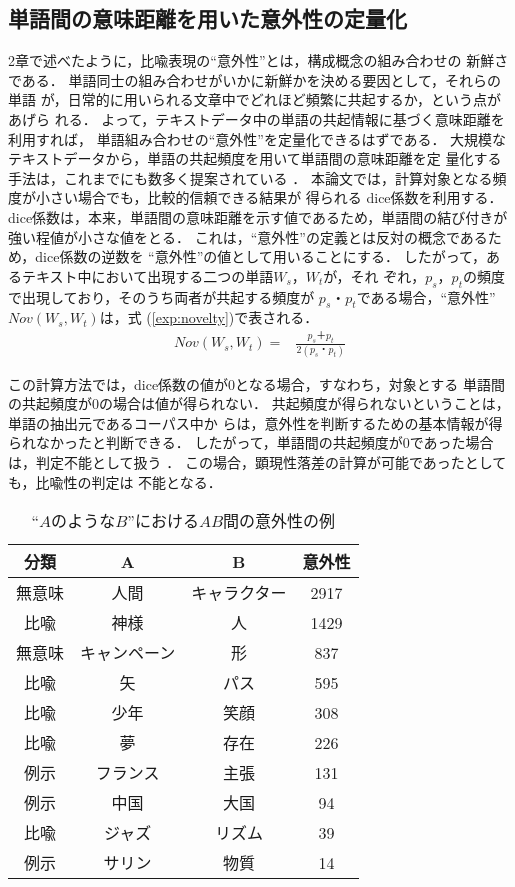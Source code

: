 \subsection{単語間の意味距離を用いた意外性の定量化}
2章で述べたように，比喩表現の``意外性''とは，構成概念の組み合わせの
新鮮さである．
単語同士の組み合わせがいかに新鮮かを決める要因として，それらの単語
が，日常的に用いられる文章中でどれほど頻繁に共起するか，という点があげら
れる．
よって，テキストデータ中の単語の共起情報に基づく意味距離を利用すれば，
単語組み合わせの``意外性''を定量化できるはずである．
大規模なテキストデータから，単語の共起頻度を用いて単語間の意味距離を定
量化する手法は，これまでにも数多く提案されている
\cite{Salton1989,Church1990,Smaja1993}．
本論文では，計算対象となる頻度が小さい場合でも，比較的信頼できる結果が
得られる dice係数を利用する．
 dice係数は，本来，単語間の意味距離を示す値であるため，単語間の結び付きが
強い程値が小さな値をとる．
これは，``意外性''の定義とは反対の概念であるため，dice係数の逆数を
``意外性''の値として用いることにする．
したがって，あるテキスト中において出現する二つの単語$W_s$，$W_t$が，それ
ぞれ，$p_s$，$p_t$の頻度で出現しており，そのうち両者が共起する頻度が
$p_s・p_t$である場合，``意外性''$Nov(W_s,W_t)$は，式
(\ref{exp:novelty})で表される．
\begin{eqnarray}
\label{exp:novelty}
Nov(W_s,W_t) = & \frac{p_s＋p_t}{2(p_s・p_t)}
\end{eqnarray}

この計算方法では，dice係数の値が0となる場合，すなわち，対象とする
単語間の共起頻度が0の場合は値が得られない．
共起頻度が得られないということは，単語の抽出元であるコーパス中か
らは，意外性を判断するための基本情報が得られなかったと判断できる．
したがって，単語間の共起頻度が0であった場合は，判定不能として扱う
．
この場合，顕現性落差の計算が可能であったとしても，比喩性の判定は
不能となる．

\begin{table}[tb]
\begin{center}
\caption{``$AのようなB$''における$AB$間の意外性の例}
\label{tbl:nov-ex}
\begin{tabular}{|c|c|c|c|}
\hline
分類	&A	&B 	&意外性\\
\hline
無意味	&人間 &キャラクター	&2917\\%
比喩	&神様 &人	&1429\\%
無意味	&キャンペーン &形&837\\%
比喩	&矢 &パス	&595\\%
比喩	&少年 &笑顔	&308\\%
比喩	&夢 &存在	&226\\%
例示	&フランス &主張	&131\\%
例示	&中国 &大国	&94\\%
比喩	&ジャズ &リズム	&39\\%
例示	&サリン &物質	&14\\%
\hline
\end{tabular}
\end{center}
\end{table}

